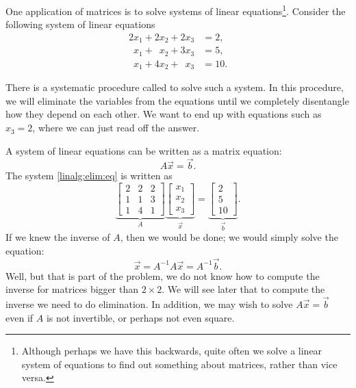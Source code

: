 One application of matrices is to solve systems of
linear equations\footnote{Although perhaps we have this backwards,
quite often we solve a linear system of equations
to find out something about matrices, rather than vice versa.}.
Consider the following system of linear equations
\begin{equation} \label{linalg:elim:eq}
\begin{aligned}
          2 x_1 +           2 x_2 +           2 x_3 & = 2 , \\
\phantom{9} x_1 + \phantom{9} x_2 +           3 x_3 & = 5 , \\
\phantom{9} x_1 +           4 x_2 + \phantom{9} x_3 & = 10 .
\end{aligned}
\end{equation}

There is a systematic procedure
called \emph{} to solve such a system.
In this procedure,
we will eliminate the variables from the equations until we completely
disentangle how they depend on each other.  We want to end up with equations
such as $x_3 = 2$, where we can just read off the answer.

A system of linear equations can be written as a matrix equation:
\begin{equation*}
A \vec{x} = \vec{b} .
\end{equation*}
The system \eqref{linalg:elim:eq} is written as
\begin{equation*}
\underbrace{
\begin{bmatrix}
2 & 2 & 2 \\
1 & 1 & 3 \\
1 & 4 & 1 
\end{bmatrix}
}_{A}
\underbrace{
\begin{bmatrix}
x_1 \\
x_2 \\
x_3
\end{bmatrix} 
}_{\vec{x}}
=
\underbrace{
\begin{bmatrix}
2 \\
5 \\
10
\end{bmatrix}
}_{\vec{b}} .
\end{equation*}
If we knew the inverse of $A$, then we would be done; we would simply solve
the equation:
\begin{equation*}
\vec{x} = A^{-1} A \vec{x} = A^{-1} \vec{b} .
\end{equation*}
Well, but that is part of the problem, we do not know how to compute the
inverse for matrices bigger than $2 \times 2$.
We will see later that to compute the inverse we need
to do elimination.  In addition, we may wish to solve $A \vec{x} = \vec{b}$
even if $A$ is not invertible, or perhaps not even square.

